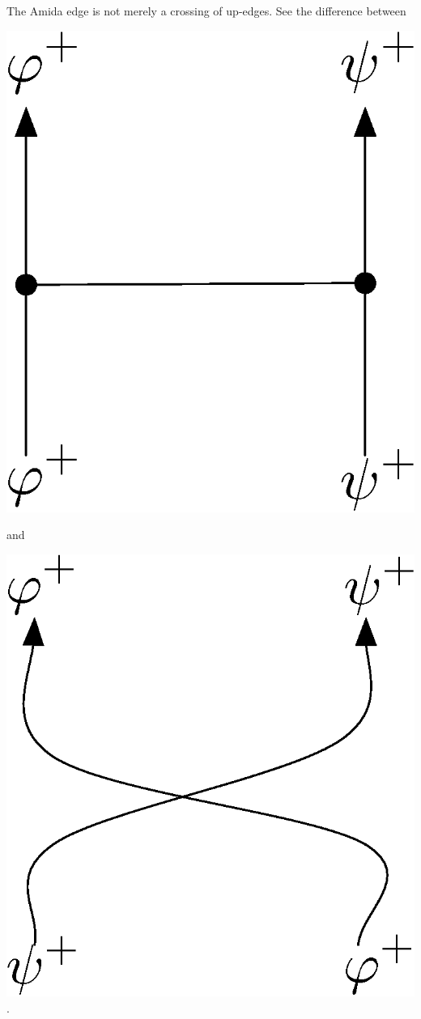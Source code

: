  The Amida edge is not merely a crossing of up-edges.
 See the difference between
 \begin{center}
\includegraphics[scale=0.4]{twoedges_amida_without_label.eps}
 \end{center}
and
 \begin{center}
\includegraphics[scale=0.4]{crossing.eps}\enspace.
 \end{center}
